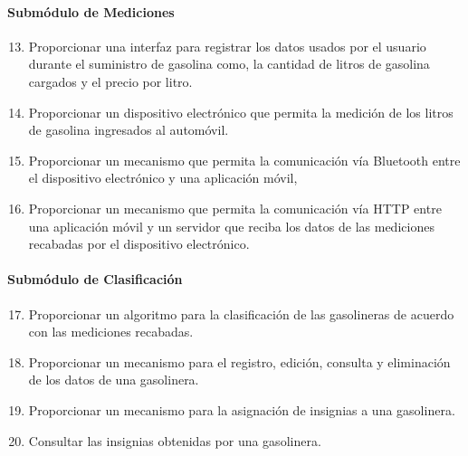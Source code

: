 \paragraph{Submódulo de Mediciones}
\begin{enumerate}[label=RF\arabic*.]
	\setcounter{enumi}{12}
	\item Proporcionar una interfaz para registrar los datos usados por el usuario durante el suministro de gasolina como, la cantidad de litros de gasolina cargados y el precio por litro.
	\item Proporcionar un dispositivo electrónico que permita la medición de los litros de gasolina ingresados al automóvil.
	\item Proporcionar un mecanismo que permita la comunicación vía Bluetooth entre el dispositivo electrónico y una aplicación móvil,
	\item Proporcionar un mecanismo que permita la comunicación vía HTTP entre una aplicación móvil y un servidor que reciba los datos de las mediciones recabadas por el dispositivo electrónico.
\end{enumerate}

\paragraph{Submódulo de Clasificación}
\begin{enumerate}[label=RF\arabic*.]
	\setcounter{enumi}{16}
	\item Proporcionar un algoritmo para la clasificación de las gasolineras de acuerdo con las mediciones recabadas.
	\item Proporcionar un mecanismo para el registro, edición, consulta y eliminación de los datos de una gasolinera.
	\item Proporcionar un mecanismo para la asignación de insignias a una gasolinera.
	\item Consultar las insignias obtenidas por una gasolinera.
\end{enumerate}